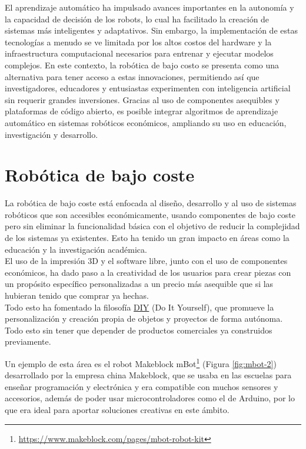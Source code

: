 El aprendizaje automático ha impulsado avances importantes en la autonomía y la capacidad de decisión de los robots, lo cual ha facilitado la creación de sistemas más inteligentes y adaptativos. Sin embargo, la implementación de estas tecnologías a menudo se ve limitada por los altos costos del hardware y la infraestructura computacional necesarios para entrenar y ejecutar modelos complejos. En este contexto, la robótica de bajo costo se presenta como una alternativa para tener acceso a estas innovaciones, permitiendo así que investigadores, educadores y entusiastas experimenten con inteligencia artificial sin requerir grandes inversiones. Gracias al uso de componentes asequibles y plataformas de código abierto, es posible integrar algoritmos de aprendizaje automático en sistemas robóticos económicos, ampliando su uso en educación, investigación y desarrollo.

 
\label{sec:cuartaseccion}


\section{Robótica de bajo coste}
\label{sec:quintaseccion}

La robótica de bajo coste está enfocada al diseño, desarrollo y al uso de sistemas robóticos que son accesibles económicamente, usando componentes de bajo coste pero sin eliminar la funcionalidad básica con el objetivo de reducir la complejidad de los sistemas ya existentes. Esto ha tenido un gran impacto en áreas como la educación y la investigación académica.\\

El uso de la impresión 3D y el software libre, junto con el uso de componentes económicos, ha dado paso a la creatividad de los usuarios para crear piezas con un propósito específico personalizadas a un precio más asequible que si las hubieran tenido que comprar ya hechas.\\


Todo esto ha fomentado la filosofía \hyperlink{DIY}{DIY} (Do It Yourself), que promueve la personalización y creación propia de objetos y proyectos de forma autónoma. Todo esto sin tener que depender de productos comerciales ya construidos previamente.

Un ejemplo de esta área es el robot Makeblock mBot\footnote{\url{https://www.makeblock.com/pages/mbot-robot-kit}} (Figura \ref{fig:mbot-2}) desarrollado por la empresa china Makeblock, que se usaba en las escuelas para enseñar programación y electrónica y era compatible con muchos sensores y accesorios, además de poder usar microcontroladores como el de Arduino, por lo que era ideal para aportar soluciones creativas en este ámbito.

